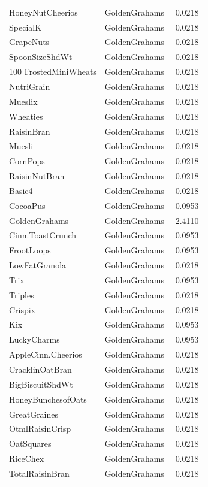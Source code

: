 \begin{longtable}{llr}
HoneyNutCheerios & GoldenGrahams & 0.0218 \\
SpecialK & GoldenGrahams & 0.0218 \\
GrapeNuts & GoldenGrahams & 0.0218 \\
SpoonSizeShdWt & GoldenGrahams & 0.0218 \\
100%
FrostedMiniWheats & GoldenGrahams & 0.0218 \\
NutriGrain & GoldenGrahams & 0.0218 \\
Mueslix & GoldenGrahams & 0.0218 \\
Wheaties & GoldenGrahams & 0.0218 \\
RaisinBran & GoldenGrahams & 0.0218 \\
Muesli & GoldenGrahams & 0.0218 \\
CornPops & GoldenGrahams & 0.0218 \\
RaisinNutBran & GoldenGrahams & 0.0218 \\
Basic4 & GoldenGrahams & 0.0218 \\
CocoaPus & GoldenGrahams & 0.0953 \\
GoldenGrahams & GoldenGrahams & -2.4110 \\
Cinn.ToastCrunch & GoldenGrahams & 0.0953 \\
FrootLoops & GoldenGrahams & 0.0953 \\
LowFatGranola & GoldenGrahams & 0.0218 \\
Trix & GoldenGrahams & 0.0953 \\
Triples & GoldenGrahams & 0.0218 \\
Crispix & GoldenGrahams & 0.0218 \\
Kix & GoldenGrahams & 0.0953 \\
LuckyCharms & GoldenGrahams & 0.0953 \\
AppleCinn.Cheerios & GoldenGrahams & 0.0218 \\
CracklinOatBran & GoldenGrahams & 0.0218 \\
BigBiscuitShdWt & GoldenGrahams & 0.0218 \\
HoneyBunchesofOats & GoldenGrahams & 0.0218 \\
GreatGraines & GoldenGrahams & 0.0218 \\
OtmlRaisinCrisp & GoldenGrahams & 0.0218 \\
OatSquares & GoldenGrahams & 0.0218 \\
RiceChex & GoldenGrahams & 0.0218 \\
TotalRaisinBran & GoldenGrahams & 0.0218 \\

\end{longtable}
